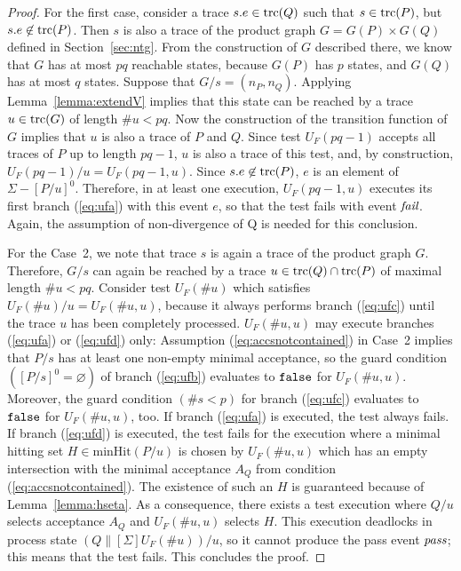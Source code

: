 \begin{proof}
For the first case, consider a  trace $s.e\in\text{trc}(Q)$ such that $s\in\text{trc}(P)$, but 
$s.e\not\in\text{trc}(P)$. Then $s$ is also a trace of the product graph $G = G(P)\times G(Q)$ defined in Section~\ref{sec:ntg}. From the construction of $G$ described there, we know that $G$ has at most $pq$ reachable states, because $G(P)$ has $p$ states, and $G(Q)$ has at most $q$ states. Suppose that $G/s = (n_P,n_Q)$. Applying Lemma~\ref{lemma:extendV} implies that this state can be reached by a trace $u\in\text{trc}(G)$ of length $\#u < pq$. Now the construction of the transition function of $G$ implies that $u$ is also a trace of $P$ and $Q$. Since test $U_F(pq-1)$ accepts all traces of $P$ up to length $pq-1$, $u$ is also a trace of this test, and, by construction, $U_F(pq-1)/u = U_F(pq-1,u)$. Since $s.e\not\in\text{trc}(P)$,
$e$ is an element of $\Sigma-[P/u]^0$. Therefore, in at least one execution, $U_F(pq-1,u)$ executes its first branch (\ref{eq:ufa}) with this event $e$, so that the test fails with event ${\text{\it fail}}$. Again, the assumption of non-divergence of Q is needed for this conclusion.

For the Case~2, we note that trace $s$ is again a trace of the product graph $G$. Therefore, $G/s$ can again be reached by a trace $u\in\text{trc}(Q)\cap\text{trc}(P)$ of maximal length
$\#u < pq$. Consider test $U_F(\# u)$ which satisfies $U_F(\# u)/u = U_F(\#u,u)$, because
it always performs branch (\ref{eq:ufc}) until the trace $u$ has been completely processed. $U_F(\#u,u)$
  may execute branches (\ref{eq:ufa}) or (\ref{eq:ufd}) only: 
Assumption (\ref{eq:accsnotcontained}) in Case~2 implies that $P/s$ has at least one non-empty minimal acceptance, so the guard condition $([P/s]^0 = \varnothing)$ of branch
 (\ref{eq:ufb}) evaluates to $\mbox{{\tt false}}$ for $U_F(\#u,u)$. Moreover, 
 the guard condition $(\#s < p)$
for branch (\ref{eq:ufc}) evaluates to $\mbox{{\tt false}}$ for $U_F(\#u,u)$, too. 
If branch (\ref{eq:ufa}) is executed, the test always fails. If branch (\ref{eq:ufd})
is executed, the test fails for the execution where a minimal hitting set 
$H\in\text{minHit}(P/u)$ is chosen by $U_F(\#u,u)$ which has an empty intersection
with the minimal acceptance $A_Q$ from condition (\ref{eq:accsnotcontained}). The existence of such an $H$ is guaranteed because of Lemma~\ref{lemma:hseta}. As a consequence, there exists 
a test execution   where $Q/u$ selects acceptance $A_Q$ and  $U_F(\#u,u)$ 
selects $H$. This execution deadlocks in 
process state $(Q\parallel[\Sigma]U_F(\# u))/u$, so it cannot 
produce the pass event ${\text{\it pass}}$; this  means that the test fails. This concludes the proof.
\xbox
\end{proof}


















